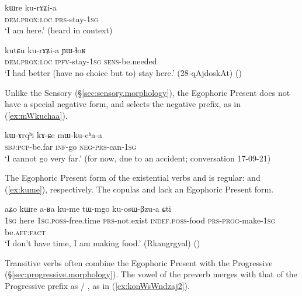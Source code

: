 \begin{exe}
\ex \label{ex:kurAZia.egoph}
\gll kɯre ku-rɤʑi-a \\
\textsc{dem}.\textsc{prox}:\textsc{loc} \textsc{prs}-stay-\textsc{1sg} \\
\glt `I am here.' (heard in context)
\end{exe}

\begin{exe}
\ex \label{ex:kurAZia.ipfv}
\gll kutɕu ku-rɤʑi-a ɲɯ-ɬoʁ \\
\textsc{dem}.\textsc{prox}:\textsc{loc} \textsc{ipfv}-stay-\textsc{1sg} \textsc{sens}-be.needed \\
\glt `I had better (have no choice but to) stay here.' (28-qAjdoskAt) 
()
\end{exe}
 
Unlike the Sensory (§\ref{sec:sensory.morphology}), the Egophoric Present does not have a special negative form, and selects the  negative prefix, as in (\ref{ex:mWkuchaa}).

\begin{exe}
\ex \label{ex:mWkuchaa}
\gll kɯ-ɤrqʰi kɤ-ɕe mɯ-ku-cʰa-a \\
\textsc{sbj}:\textsc{pcp}-be.far \textsc{inf}-go \textsc{neg}-\textsc{prs}-can-\textsc{1sg} \\
\glt `I cannot go very far.' (for now, due to an accident; conversation 17-09-21)
\end{exe}

The Egophoric Present form of the existential verbs  and  is regular:  and  (\ref{ex:kume}), respectively. The copulas  and  lack an Egophoric Present form.

\begin{exe}
	\ex \label{ex:kume}
	\gll aʑo kɯre a-ʁa ku-me tɯ-mgo ku-osɯ-βzu-a ɕti \\
	\textsc{1sg} here \textsc{1sg}.\textsc{poss}-free.time \textsc{prs}-not.exist \textsc{indef}.\textsc{poss}-food \textsc{prs}-\textsc{prog}-make-\textsc{1sg} be.\textsc{aff}:\textsc{fact}\\
	\glt `I don't have time, I am making food.'  (Rkangrgyal) ()
\end{exe}

Transitive verbs often combine the Egophoric Present with the Progressive  (§\ref{sec:progressive.morphology}). The vowel of the preverb merges with that of the Progressive prefix as  / , as in (\ref{ex:konWsWndzaj2}).

